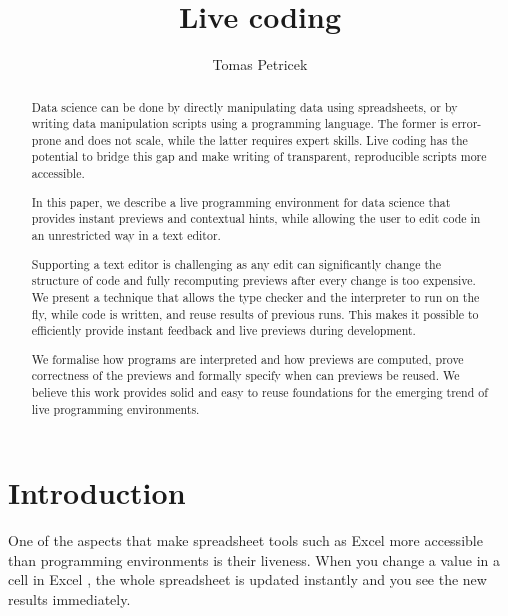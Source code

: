 \documentclass[acmsmall,anonymous,fleqn]{acmart}\settopmatter{printfolios=false,printccs=false,printacmref=false}
\title{Live coding}
\author{Tomas Petricek}
\affiliation{
  \institution{University of Kent}
  \country{United Kingdom}
}
\theoremstyle{plain}
\theoremstyle{definition}
\begin{document}
\begin{abstract}
Data science can be done by directly manipulating data using spreadsheets, or by writing
data manipulation scripts using a programming language. The former is error-prone and
does not scale, while the latter requires expert skills. Live coding has the potential to
bridge this gap and make writing of transparent, reproducible scripts more accessible.

In this paper, we describe a live programming environment for data science that provides instant
previews and contextual hints, while allowing the user to edit code in an unrestricted way in
a text editor.

Supporting a text editor is challenging as any edit can significantly change the structure of code and
fully recomputing previews after every change is too expensive. We present a technique that allows the type
checker and the interpreter to run on the fly, while code is written, and reuse results of previous
runs. This makes it possible to efficiently provide instant feedback and live previews during development.

We formalise how programs are interpreted and how previews are computed, prove correctness
of the previews and formally specify when can previews be reused. We believe this work provides
solid and easy to reuse foundations for the emerging trend of live programming environments.
\end{abstract}
\maketitle


\section{Introduction}
\label{sec:intro}

One of the aspects that make spreadsheet tools such as Excel more accessible than programming
environments is their liveness. When you change a value in a cell in Excel \cite{spreadsheet}, the
whole spreadsheet is updated instantly and you see the new results immediately.
\end{document}
